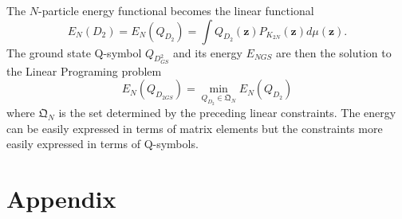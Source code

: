 \documentclass[aps,preprint]{revtex4}%
\begin{document}
The $N$-particle energy functional becomes the linear functional%
\begin{equation}
E_{N}\left(  D_{2}\right)  =E_{N}\left(  Q_{D_{2}}\right)  =\int Q_{D_{2}%
}\left(  \mathbf{z}\right)  P_{K_{2N}}\left(  \mathbf{z}\right)  d\mu\left(
\mathbf{z}\right)  .
\end{equation}
The ground state Q-symbol $Q_{D_{GS}^{2}}$ and its energy $E_{NGS}$ are then
the solution to the Linear Programing problem
\begin{equation}
E_{N}\left(  Q_{D_{2GS}}\right)  =\min_{Q_{D_{2}}\in\mathfrak{Q}_{N}}%
E_{N}\left(  Q_{D_{2}}\right)
\end{equation}
where $\mathfrak{Q}_{N}$ is the set determined by the preceding linear
constraints. The energy can be easily expressed in terms of matrix elements
but the constraints more easily expressed in terms of Q-symbols.

\section{Appendix}
\end{document}
